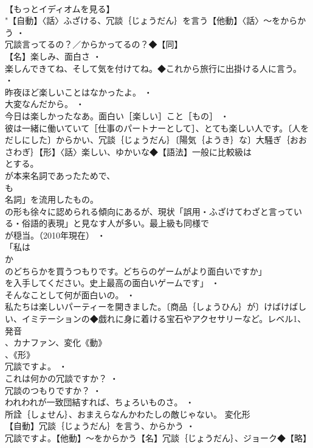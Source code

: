 \documentclass[8pt]{extreport}
\begin{document}
\begin{CJK}{UTF8}{min}
\\	【もっとイディオムを見る】
\\	"【自動】〈話〉ふざける、冗談｛じょうだん｝を言う【他動】〈話〉～をからかう ・
\\	冗談言ってるの？／からかってるの？◆【同】
\\	【名】楽しみ、面白さ ・
\\	楽しんできてね、そして気を付けてね。◆これから旅行に出掛ける人に言う。 ・
\\	昨夜ほど楽しいことはなかったよ。 ・
\\	大変なんだから。 ・
\\	今日は楽しかったなあ。面白い［楽しい］こと［もの］ ・
\\	彼は一緒に働いていて［仕事のパートナーとして］、とても楽しい人です。〔人をだしにした〕からかい、冗談｛じょうだん｝〔陽気｛ようき｝な〕大騒ぎ｛おおさわぎ｝【形】〈話〉楽しい、ゆかいな◆【語法】一般に比較級は
\\	とする。
\\	が本来名詞であったためで、
\\	も
\\	名詞」を流用したもの。
\\	の形も徐々に認められる傾向にあるが、現状「誤用・ふざけてわざと言っている・俗語的表現」と見なす人が多い。最上級も同様で
\\	が穏当。（2010年現在） ・
\\	「私は
\\	か
\\	のどちらかを買うつもりです。どちらのゲームがより面白いですか」
\\	を入手してください。史上最高の面白いゲームです」 ・
\\	そんなことして何が面白いの。 ・
\\	私たちは楽しいパーティーを開きました。〔商品｛しょうひん｝が〕けばけばしい、イミテーションの◆戯れに身に着ける宝石やアクセサリーなど。レベル1、発音
\\	、カナファン、変化《動》
\\	、《形》
\\	冗談ですよ。 ・
\\	これは何かの冗談ですか？ ・
\\	冗談のつもりですか？ ・
\\	われわれが一致団結すれば、ちょろいものさ。 ・
\\	所詮｛しょせん｝、おまえらなんかわたしの敵じゃない。	変化形 
\\	【自動】冗談｛じょうだん｝を言う、からかう ・
\\	冗談ですよ。【他動】～をからかう【名】冗談｛じょうだん｝、ジョーク◆【略】

\end{CJK}
\end{document}
